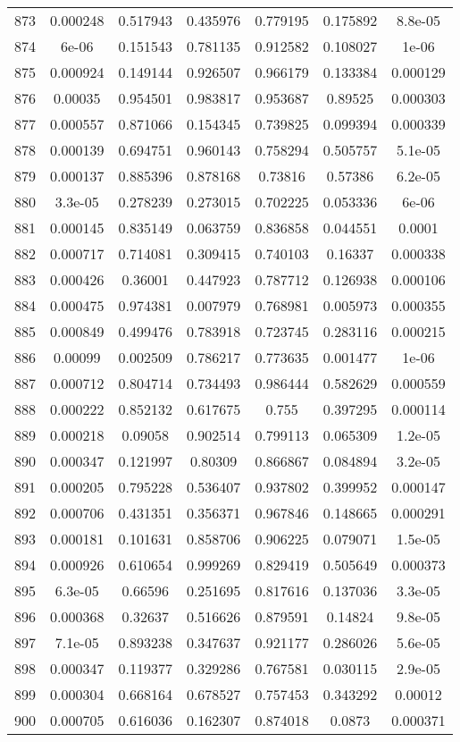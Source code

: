 \begin{table}
\begin{tabular}{c|c|c|c|c|c|c}
873 & 0.000248 & 0.517943 & 0.435976 & 0.779195 & 0.175892 & 8.8e-05\\
874 & 6e-06 & 0.151543 & 0.781135 & 0.912582 & 0.108027 & 1e-06\\
875 & 0.000924 & 0.149144 & 0.926507 & 0.966179 & 0.133384 & 0.000129\\
876 & 0.00035 & 0.954501 & 0.983817 & 0.953687 & 0.89525 & 0.000303\\
877 & 0.000557 & 0.871066 & 0.154345 & 0.739825 & 0.099394 & 0.000339\\
878 & 0.000139 & 0.694751 & 0.960143 & 0.758294 & 0.505757 & 5.1e-05\\
879 & 0.000137 & 0.885396 & 0.878168 & 0.73816 & 0.57386 & 6.2e-05\\
880 & 3.3e-05 & 0.278239 & 0.273015 & 0.702225 & 0.053336 & 6e-06\\
881 & 0.000145 & 0.835149 & 0.063759 & 0.836858 & 0.044551 & 0.0001\\
882 & 0.000717 & 0.714081 & 0.309415 & 0.740103 & 0.16337 & 0.000338\\
883 & 0.000426 & 0.36001 & 0.447923 & 0.787712 & 0.126938 & 0.000106\\
884 & 0.000475 & 0.974381 & 0.007979 & 0.768981 & 0.005973 & 0.000355\\
885 & 0.000849 & 0.499476 & 0.783918 & 0.723745 & 0.283116 & 0.000215\\
886 & 0.00099 & 0.002509 & 0.786217 & 0.773635 & 0.001477 & 1e-06\\
887 & 0.000712 & 0.804714 & 0.734493 & 0.986444 & 0.582629 & 0.000559\\
888 & 0.000222 & 0.852132 & 0.617675 & 0.755 & 0.397295 & 0.000114\\
889 & 0.000218 & 0.09058 & 0.902514 & 0.799113 & 0.065309 & 1.2e-05\\
890 & 0.000347 & 0.121997 & 0.80309 & 0.866867 & 0.084894 & 3.2e-05\\
891 & 0.000205 & 0.795228 & 0.536407 & 0.937802 & 0.399952 & 0.000147\\
892 & 0.000706 & 0.431351 & 0.356371 & 0.967846 & 0.148665 & 0.000291\\
893 & 0.000181 & 0.101631 & 0.858706 & 0.906225 & 0.079071 & 1.5e-05\\
894 & 0.000926 & 0.610654 & 0.999269 & 0.829419 & 0.505649 & 0.000373\\
895 & 6.3e-05 & 0.66596 & 0.251695 & 0.817616 & 0.137036 & 3.3e-05\\
896 & 0.000368 & 0.32637 & 0.516626 & 0.879591 & 0.14824 & 9.8e-05\\
897 & 7.1e-05 & 0.893238 & 0.347637 & 0.921177 & 0.286026 & 5.6e-05\\
898 & 0.000347 & 0.119377 & 0.329286 & 0.767581 & 0.030115 & 2.9e-05\\
899 & 0.000304 & 0.668164 & 0.678527 & 0.757453 & 0.343292 & 0.00012\\
900 & 0.000705 & 0.616036 & 0.162307 & 0.874018 & 0.0873 & 0.000371\\
\end{tabular}
\end{table}
